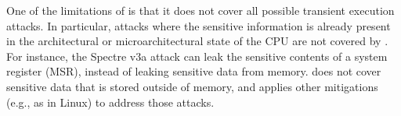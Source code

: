

One of the limitations of \contract{} is that it does not cover all
possible transient execution attacks.  In particular, attacks where
the sensitive information is already present in the architectural or
microarchitectural state of the CPU are not covered by \contract{}.
For instance, the Spectre v3a attack can leak the sensitive contents of
a system register (MSR), instead of leaking sensitive data from memory.
\contract{} does not cover sensitive data that is stored outside of
memory, and \sys applies other mitigations (e.g., as in Linux) to address
those attacks.

